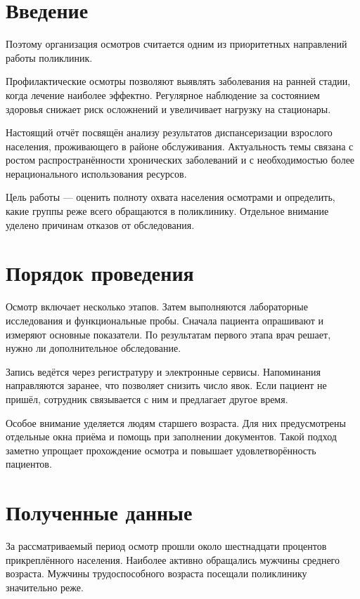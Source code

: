 \chapter{Введение}

Поэтому организация осмотров считается одним из приоритетных направлений работы
поликлиник.

Профилактические осмотры позволяют выявлять заболевания на ранней стадии, когда
лечение наиболее эффектно. Регулярное наблюдение за состоянием здоровья снижает
риск осложнений и увеличивает нагрузку на стационары.

Настоящий отчёт посвящён анализу результатов диспансеризации взрослого населения,
проживающего в районе обслуживания. Актуальность темы связана с ростом
распространённости хронических заболеваний и с необходимостью более нерационального
использования ресурсов.

Цель работы — оценить полноту охвата населения осмотрами и определить, какие
группы реже всего обращаются в поликлинику. Отдельное внимание уделено причинам
отказов от обследования.

\chapter{Порядок проведения}

Осмотр включает несколько этапов. Затем выполняются лабораторные исследования и
функциональные пробы. Сначала пациента опрашивают и измеряют основные показатели. По
результатам первого этапа врач решает, нужно ли дополнительное обследование.

Запись ведётся через регистратуру и электронные сервисы. Напоминания направляются
заранее, что позволяет снизить число явок. Если пациент не пришёл, сотрудник
связывается с ним и предлагает другое время.

Особое внимание уделяется людям старшего возраста. Для них предусмотрены
отдельные окна приёма и помощь при заполнении документов. Такой подход заметно
упрощает прохождение осмотра и повышает удовлетворённость пациентов.

\chapter{Полученные данные}

За рассматриваемый период осмотр прошли около шестнадцати процентов прикреплённого
населения. Наиболее активно обращались мужчины среднего возраста. Мужчины
трудоспособного возраста посещали поликлинику значительно реже.

